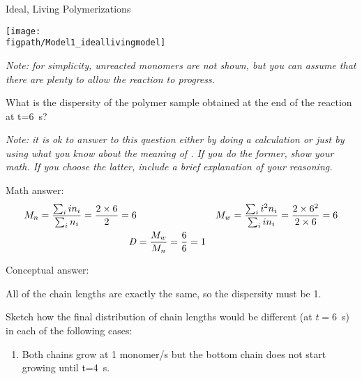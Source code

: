 \begin{activity}{Ideal, Living Polymerizations}
\begin{model}
	    \vspace{6pt}
	    	\centerline{\texttt{[image: \\figpath/Model1\_ideallivingmodel]}}
	    	
	    	\emph{Note: for simplicity, unreacted monomers are not shown, but you can assume that there are plenty to allow the reaction to progress.}
	
\end{model}


\begin{ctqs}

	\question What is the dispersity of the polymer sample obtained at the end of the reaction at t=6~s?
		
				\emph{Note: it is ok to answer to this question either by doing a calculation or just by using what you know about the meaning of \PDItext.  If you do the former, show your math. If you choose the latter, include a brief explanation of your reasoning.}
			
				\begin{solution}[1.5in]
				
					Math answer:
						\begin{align*}
							M_n = \frac{\sum_i i n_i}{\sum_i n_i} = \frac{2\times 6}{2} = 6 &&&
							M_w = \frac{\sum_i i^2 n_i}{\sum_i i n_i} = \frac{2\times 6^2}{2\times 6} = 6\\
							\PDImath &= \frac{M_w}{M_n} = \frac{6}{6} = 1
						\end{align*}
					
					Conceptual answer:
					
						All of the chain lengths are exactly the same, so the dispersity must be 1.
						
				\end{solution}

	\question Sketch how the final distribution of chain lengths would be different (at $t=6$~s) in each of the following cases:

		\begin{enumerate}

			\item Both chains grow at 1 monomer/s but the bottom chain does not start growing until t=4~s.
			
				\begin{solution}[0.55in]\studentdisplay{
				}
				\end{solution}


\end{enumerate}
\end{ctqs}
\end{activity}
